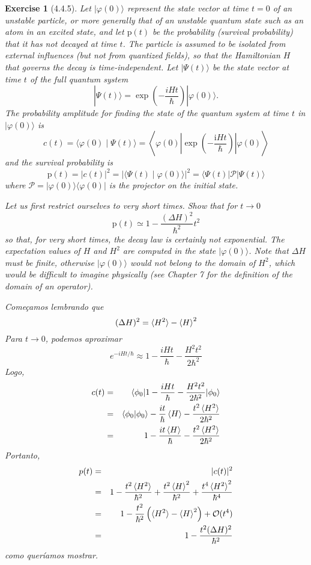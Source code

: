 \documentclass[12pt]{article}
\def\be{\begin{equation}}
\def\ee{\end{equation}}
\def\bea{\begin{eqnarray*}}
\def\eea{\end{eqnarray*}}
\def\f{\frac}
\def\l{\left}
\def\r{\right}
\newtheorem{exercise}{Exercise}
\begin{document}
	\begin{exercise}[4.4.5]
		Let $|\varphi(0)\rangle$ represent the state vector at time $t=0$ of an unstable particle, or more generally that of an unstable quantum state such as an atom in an excited state, and let $\mathrm{p}(t)$ be the probability (survival probability) that it has not decayed at time $t$. The particle is assumed to be isolated from external influences (but not from quantized fields), so that the Hamiltonian $H$ that governs the decay is time-independent. Let $|\Psi(t)\rangle$ be the state vector at time $t$ of the full quantum system
		$$
		|\Psi(t)\rangle=\exp \left(-\frac{i H t}{\hbar}\right)|\varphi(0)\rangle .
		$$
		The probability amplitude for finding the state of the quantum system at time $t$ in $|\varphi(0)\rangle$ is
		$$
		c(t)=\langle\varphi(0) \mid \Psi(t)\rangle=\left\langle\varphi(0)\left|\exp \left(-\frac{\mathrm{i} H t}{\hbar}\right)\right| \varphi(0)\right\rangle
		$$
		and the survival probability is
		$$
		\mathrm{p}(t)=|c(t)|^{2}=|\langle\Psi(t) \mid \varphi(0)\rangle|^{2}=\langle\Psi(t)|\mathcal{P}| \Psi(t)\rangle
		$$
		where $\mathcal{P}=|\varphi(0)\rangle\langle\varphi(0)|$ is the projector on the initial state.
		\begin{exercises}
			\item Let us first restrict ourselves to very short times. Show that for $t \rightarrow 0$
			$$
			\mathrm{p}(t) \simeq 1-\frac{(\Delta H)^{2}}{\hbar^{2}} t^{2}
			$$
			so that, for very short times, the decay law is certainly not exponential. The expectation values of $H$ and $H^{2}$ are computed in the state $|\varphi(0)\rangle$. Note that $\Delta H$ must be finite, otherwise $|\varphi(0)\rangle$ would not belong to the domain of $H^{2}$, which would be difficult to imagine physically (see Chapter 7 for the definition of the domain of an operator).
			\begin{multianswer}
				Começamos lembrando que
				\be
					(\Delta H)^2 = \braket{H^2} - \braket{H}^2
				\ee
				Para $t\to0$, podemos aproximar
				\be
					e^{-iHt/\hbar} \approx 1 -\f{iHt}{\hbar} - \f{H^2t^2}{2\hbar^2}
				\ee
				Logo, 
				\bea
					c(t) &=& \braket{\phi_0 | 1 - \f{iHt}{\hbar} - \f{H^2t^2}{2\hbar^2} | \phi_0} \\
						&=& \braket{\phi_0|\phi_0} - \f{it}{\hbar}  \braket{H} - \f{t^2\braket{H^2}}{2\hbar^2}\\
						&=& 1 - \f{it\braket{H}}{\hbar} - \f{t^2\braket{H^2}}{2\hbar^2}
				\eea
				Portanto,
				\bea
					p(t) &=& |c(t)|^2 \\
						&=& 1  - \f{t^2\braket{H^2}}{\hbar^2}  + \f{t^2\braket{H}^2}{\hbar^2} + \f{t^4\braket{H^2}^2}{\hbar^4} \\
						&=& 1 - \f{t^2}{\hbar^2}\l(\braket{H^2}  - \braket{H}^2 \r) + \mathcal{O}(t^4)  \\
						&=& 1 - \f{t^2(\Delta H)^2}{\hbar^2}
				\eea
				como queríamos mostrar. 
			\end{multianswer}
		

\end{exercises}
\end{exercise}
\end{document}
